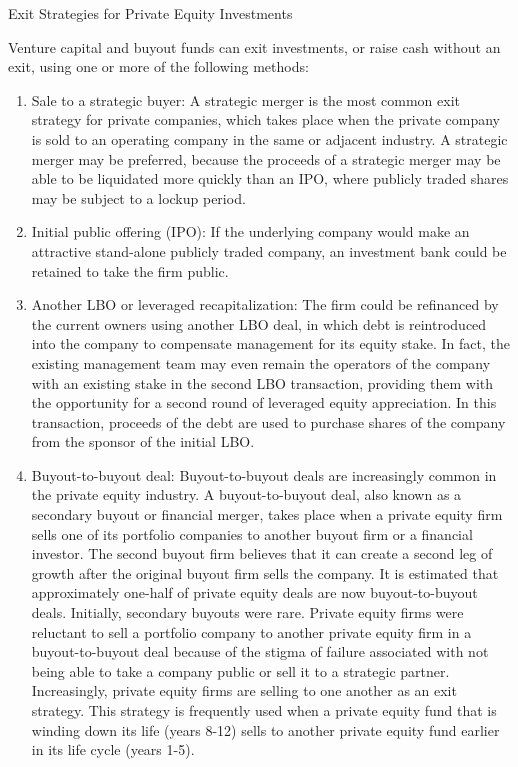 \documentclass[11pt]{article}
\begin{document}
Exit Strategies for Private Equity Investments

Venture capital and buyout funds can exit investments, or raise cash without an exit, using one or more of the following methods:

\begin{enumerate}
  \item Sale to a strategic buyer: A strategic merger is the most common exit strategy for private companies, which takes place when the private company is sold to an operating company in the same or adjacent industry. A strategic merger may be preferred, because the proceeds of a strategic merger may be able to be liquidated more quickly than an IPO, where publicly traded shares may be subject to a lockup period.

  \item Initial public offering (IPO): If the underlying company would make an attractive stand-alone publicly traded company, an investment bank could be retained to take the firm public.

  \item Another LBO or leveraged recapitalization: The firm could be refinanced by the current owners using another LBO deal, in which debt is reintroduced into the company to compensate management for its equity stake. In fact, the existing management team may even remain the operators of the company with an existing stake in the second LBO transaction, providing them with the opportunity for a second round of leveraged equity appreciation. In this transaction, proceeds of the debt are used to purchase shares of the company from the sponsor of the initial LBO.

  \item Buyout-to-buyout deal: Buyout-to-buyout deals are increasingly common in the private equity industry. A buyout-to-buyout deal, also known as a secondary buyout or financial merger, takes place when a private equity firm sells one of its portfolio companies to another buyout firm or a financial investor. The second buyout firm believes that it can create a second leg of growth after the original buyout firm sells the company. It is estimated that approximately one-half of private equity deals are now buyout-to-buyout deals. Initially, secondary buyouts were rare. Private equity firms were reluctant to sell a portfolio company to another private equity firm in a buyout-to-buyout deal because of the stigma of failure associated with not being able to take a company public or sell it to a strategic partner. Increasingly, private equity firms are selling to one another as an exit strategy. This strategy is frequently used when a private equity fund that is winding down its life (years 8-12) sells to another private equity fund earlier in its life cycle (years 1-5).


\end{enumerate}
\end{document}
